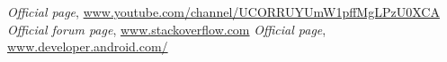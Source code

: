 \begin{thebibliography}{99999}
\singlespace\normalsize

 \textit{ Official page}, \url{www.youtube.com/channel/UCORRUYUmW1pffMgLPzU0XCA}
 \textit{ Official forum page}, \url{www.stackoverflow.com}
 \textit{ Official page}, \url{www.developer.android.com/}



\end{thebibliography}
